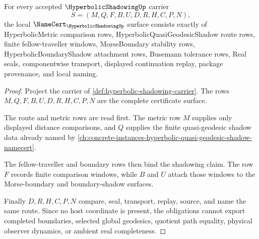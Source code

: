 \begin{theorem}
\label{thm:hyperbolic-shadowing-namecert-obligations}
For every accepted $\HyperbolicShadowingUp$ carrier
$$
S=(M,Q,F,B,U,D,R,H,C,P,N),
$$
the local $\NameCert_{\HyperbolicShadowingUp}$ surface consists exactly of HyperbolicMetric comparison rows, HyperbolicQuasiGeodesicShadow route rows, finite fellow-traveller windows, MorseBoundary stability rows, HyperbolicBoundaryShadow attachment rows, Busemann tolerance rows, Real seals, componentwise transport, displayed continuation replay, package provenance, and local naming.
\end{theorem}
\begin{proof}
Project the carrier of \autoref{def:hyperbolic-shadowing-carrier}. The rows $M,Q,F,B,U,D,R,H,C,P,N$ are the complete certificate surface.

The route and metric rows are read first. The metric row $M$ supplies only displayed distance comparisons, and $Q$ supplies the finite quasi-geodesic shadow data already named by \autoref{ch:concrete-instances-hyperbolic-quasi-geodesic-shadow-namecert}.

The fellow-traveller and boundary rows then bind the shadowing claim. The row $F$ records finite comparison windows, while $B$ and $U$ attach those windows to the Morse-boundary and boundary-shadow surfaces.

Finally $D,R,H,C,P,N$ compare, seal, transport, replay, source, and name the same route. Since no host coordinate is present, the obligations cannot export completed boundaries, selected global geodesics, quotient path equality, physical observer dynamics, or ambient real completeness.
\end{proof}

